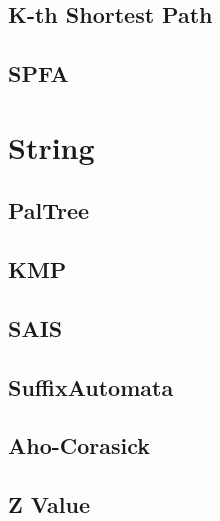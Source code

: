 \documentclass[a4paper,10pt,twocolumn,oneside]{article}
\begin{document}
\subsection{K-th Shortest Path}


\subsection{SPFA}


%


\section{String}
\subsection{PalTree}


%

\subsection{KMP}


\subsection{SAIS}


\subsection{SuffixAutomata}


\subsection{Aho-Corasick}


\subsection{Z Value}

\end{document}
